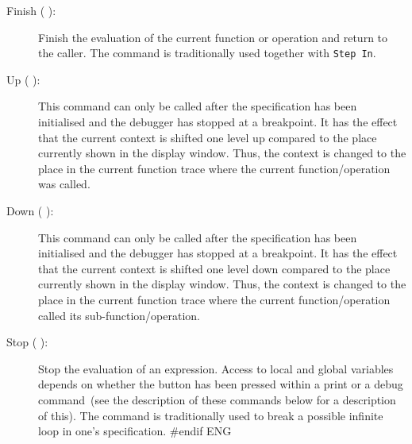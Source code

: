 \documentclass[\pformat,12pt]{article}
\newcommand{\guicmd}[1]{{\sf #1}}
\newcommand{\guicmd}[1]{{\gt #1}}
\begin{document}
\begin{description}
\item[\guicmd{Finish} (\hspace{-1.8mm}
):] 
Finish the evaluation of the current function
  or operation and return to the caller. The command is traditionally
  used together with {\tt Step In}.
  
\item[\guicmd{Up} (\hspace{-1.8mm}
):] 
This command can only be called after the
specification has been initialised and the debugger has stopped at a
breakpoint. It has the effect that the current context is shifted one
level up compared to the place currently shown in the display
window. Thus, the context is changed to the place in the current
function trace where the current function/operation was called.

\item[\guicmd{Down} (\hspace{-1.8mm}
):]
This command can only be called after the specification has been
initialised and the debugger has stopped at a breakpoint. It has the
effect that the current context is shifted one level down compared to
the place currently shown in the display window. Thus, the context is
changed to the place in the current function trace where the current
function/operation called its sub-function/operation.

\item[\guicmd{Stop} (\hspace{-1.8mm}
):] 
Stop the evaluation of an
  expression. Access to local and global variables depends on whether
  the button has been pressed within a \guicmd{print} or a
  \guicmd{debug} command~(see the description of these commands below
  for a description of this). The command is traditionally
  used to break a possible infinite loop in one's specification.
#endif ENG


\end{description}
\end{document}
